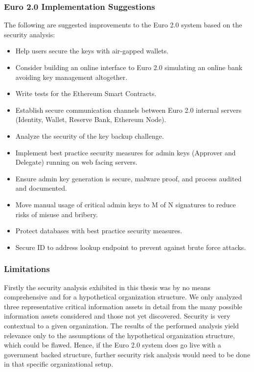 \documentclass[a4paper,12pt]{article} %
\begin{document}
{\subsubsection{Euro 2.0 Implementation Suggestions} \label{ssec:5.5:suggestions}
The following are suggested improvements to the Euro 2.0 system based on the security analysis:

\begin{itemize}
	\item Help users secure the keys with air-gapped wallets.
	\item Consider building an online interface to Euro 2.0 simulating an online bank avoiding key management altogether.
	\item Write tests for the Ethereum Smart Contracts.
	\item Establish secure communication channels between Euro 2.0 internal servers (Identity, Wallet, Reserve Bank, Ethereum Node).
	\item Analyze the security of the key backup challenge.
	\item Implement best practice security measures for admin keys (Approver and Delegate) running on web facing servers.
	\item Ensure admin key generation is secure, malware proof, and process audited and documented.
	\item Move manual usage of critical admin keys to M of N signatures to reduce risks of misuse and bribery.
	\item Protect databases with best practice security measures.
	\item Secure ID to address lookup endpoint to prevent against brute force attacks.
\end{itemize}

\subsubsection{Limitations} \label{ssec:5.5:limitations}

Firstly the security analysis exhibited in this thesis was by no means comprehensive and for a hypothetical organization structure. We only analyzed three representative critical information assets in detail from the many possible information assets considered and those not yet discovered. Security is very contextual to a given organization. The results of the performed analysis yield relevance only to the assumptions of the hypothetical organization structure, which could be flawed. Hence, if the Euro 2.0 system does go live with a government backed structure, further security risk analysis would need to be done in that specific organizational setup.

}
\end{document}
